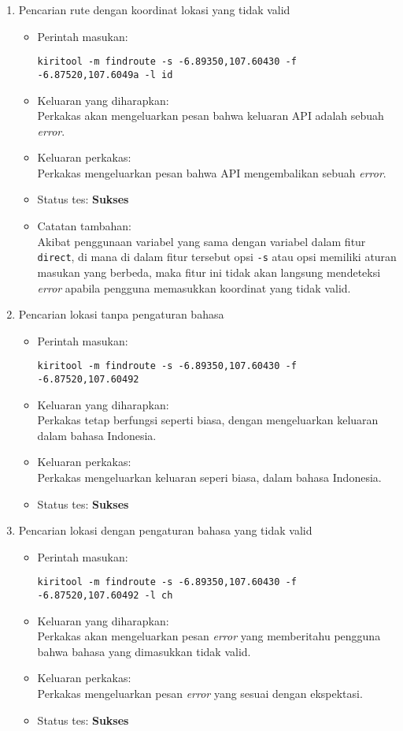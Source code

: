 \begin{enumerate}
	\item Pencarian rute dengan koordinat lokasi yang tidak valid
	\begin{itemize}
		\item Perintah masukan:
		\begin{verbatim}
kiritool -m findroute -s -6.89350,107.60430 -f -6.87520,107.6049a -l id
		\end{verbatim}
		\item Keluaran yang diharapkan: \\
		Perkakas akan mengeluarkan pesan bahwa keluaran API adalah sebuah \textit{error}.
		\item Keluaran perkakas: \\
		Perkakas  mengeluarkan pesan bahwa API mengembalikan sebuah \textit{error}.
		\item Status tes: \textbf{Sukses}
		\item Catatan tambahan: \\
		Akibat penggunaan variabel yang sama dengan variabel dalam fitur \verb|direct|, di mana di dalam fitur tersebut opsi \verb|-s| atau opsi \verb|| memiliki aturan masukan yang berbeda, maka fitur ini tidak akan langsung mendeteksi \textit{error} apabila pengguna memasukkan koordinat yang tidak valid.
	\end{itemize}
	
	\item Pencarian lokasi tanpa pengaturan bahasa
	\begin{itemize}
		\item Perintah masukan:
		\begin{verbatim}
kiritool -m findroute -s -6.89350,107.60430 -f -6.87520,107.60492
		\end{verbatim}
		\item Keluaran yang diharapkan: \\
		Perkakas tetap berfungsi seperti biasa, dengan mengeluarkan keluaran dalam bahasa Indonesia.
		\item Keluaran perkakas: \\
		Perkakas mengeluarkan keluaran seperi biasa, dalam bahasa Indonesia.
		\item Status tes: \textbf{Sukses}
	\end{itemize}
	
	\item Pencarian lokasi dengan pengaturan bahasa yang tidak valid
	\begin{itemize}
		\item Perintah masukan:
		\begin{verbatim}
kiritool -m findroute -s -6.89350,107.60430 -f -6.87520,107.60492 -l ch
		\end{verbatim}
		\item Keluaran yang diharapkan: \\
		Perkakas akan mengeluarkan pesan \textit{error} yang memberitahu pengguna bahwa bahasa yang dimasukkan tidak valid.
		\item Keluaran perkakas: \\
		Perkakas mengeluarkan pesan \textit{error} yang sesuai dengan ekspektasi.
		\item Status tes: \textbf{Sukses}
	\end{itemize}
	

\end{enumerate}
